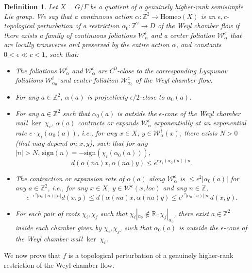 \documentclass[11pt]{amsart}
\numberwithin{equation}{section}
\newcommand{\R}{\mathbb{R}}
\newcommand{\Z}{\mathbb{Z}}
\newcommand{\W}{\mathcal{W}}
\theoremstyle{plain}
\newtheorem{defi}{Definition}[section]
\begin{document}
\begin{defi}\label{topper}
 Let $X=G/\Gamma$ be a quotient of a genuinely higher-rank semisimple Lie group. We say that a continuous action $\alpha:\Z^2 \to \mathrm{Homeo}(X)$ is an \emph{$\epsilon,c$-topological perturbation} of a restriction $\alpha_0: \Z^2\to D$ of the Weyl chamber flow if there exists a family of continuous foliations $\W^i_\alpha$ and a center foliation $\W^c_\alpha$ that are locally transverse and preserved by the entire action $\alpha$, and constants $0<\epsilon\ll c<1$, such that:
 \begin{itemize}
 \item The foliations $\W^i_\alpha$ and $\W^c_\alpha$ are $C^0$-close to the corresponding Lyapunov foliations $\W^i_{\alpha_0}$ and center foliation $\W^c_{\alpha_0}$ of the Weyl chamber flow.

 \item For any $a\in \Z^2$, $\alpha(a)$ is projectively $\epsilon/2$-close to $\alpha_0(a)$.
 
 \item For any $a\in \Z^2$ such that $\alpha_0(a)$ is outside the $\epsilon$-cone of the Weyl chamber wall $\ker\;\chi_i$, $\alpha(a)$ contracts or expands $\W^i_\alpha$ exponentially at an exponential rate $c\cdot\chi_i(\alpha_0(a))$, i.e., for any $x\in X$, $y\in \W^i_\alpha(x)$, there exists $N>0$ (that may depend on $x,y$), such that for any $|n|>N, \,\mathrm{sign}(n)=-\mathrm{sign}(\chi_i(\alpha_0(a))),$ $$d(\alpha(na)x,\alpha(na)y)\le e^{c\chi_i(\alpha_0(a))n}.$$
 
 \item The contraction or expansion rate of $\alpha(a)$ along $\W^c_\alpha$ is $\le \epsilon^2|\alpha_0(a)|$ for any $a\in\Z^2$, i.e., for any $x\in X$, $y\in \W^c(x,loc)$ and any $n\in \Z$, $$e^{-\epsilon^2|\alpha_0(a)||n|}d(x,y)\le d(\alpha(na)x,\alpha(na)y)\le e^{\epsilon^2|\alpha_0(a)||n|}d(x,y).$$

 \item For each pair of roots $\chi_i,\chi_j$ such that $\chi_i|_{\alpha_0}\notin \R\cdot \chi_j|_{\alpha_0}$, there exist $a\in \Z^2$ inside each chamber given by $\chi_i,\chi_j$, such that $\alpha_0(a)$ is outside the $\epsilon$-cone of the Weyl chamber wall $\ker\;\chi_i$.
 \end{itemize}
\end{defi}

We now prove that $f$ is a topological perturbation of a genuinely higher-rank restriction of the Weyl chamber flow.
\end{document}
